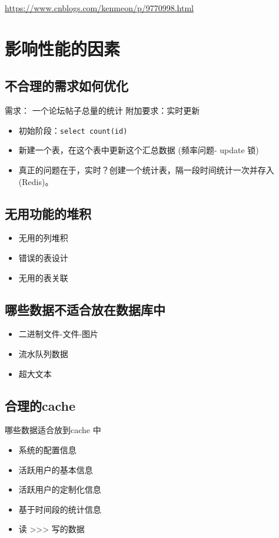\documentclass[UTF8,a4paper,12pt]{ctexbook}
\begin{document}
	
	\url{https://www.cnblogs.com/kenmeon/p/9770998.html}
	
	
	\section{影响性能的因素}
		\subsection{不合理的需求如何优化}
			需求： 一个论坛帖子总量的统计
			附加要求：实时更新
			
			\begin{itemize}
				\item 初始阶段：\verb|select count(id)|
				\item 新建一个表，在这个表中更新这个汇总数据 (频率问题- update 锁)
				\item 真正的问题在于，实时？创建一个统计表，隔一段时间统计一次并存入(Redis)。
			\end{itemize}
		
		\subsection{无用功能的堆积}
			\begin{itemize}
				\item 无用的列堆积
				\item 错误的表设计
				\item 无用的表关联
			\end{itemize}
		
		
		\subsection{哪些数据不适合放在数据库中}
			\begin{itemize}
				\item 二进制文件-文件-图片
				\item 流水队列数据
				\item 超大文本
			\end{itemize}
		
		
		\subsection{合理的cache}
			哪些数据适合放到cache 中
			\begin{itemize}
				\item 系统的配置信息 
				\item 活跃用户的基本信息 
				\item 活跃用户的定制化信息
				\item 基于时间段的统计信息
				\item 读 >>> 写的数据
			\end{itemize}
		
\end{document}
